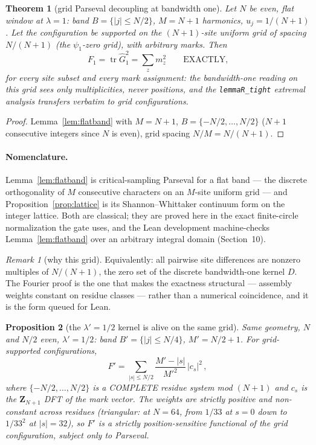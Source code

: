\documentclass[11pt]{article}
\theoremstyle{plain}
\newtheorem{theorem}{Theorem}[section]
\newtheorem{proposition}[theorem]{Proposition}
\theoremstyle{definition}
\theoremstyle{remark}
\newtheorem*{remk}{Remark}
\newcommand{\Z}{\mathbf{Z}}
\newcommand{\Gh}{\widehat{G}}
\newcommand{\tr}{\operatorname{tr}}
\begin{document}
\begin{theorem}[grid Parseval decoupling at bandwidth one]
\label{thm:parseval}
Let $N$ be even, flat window at $\lambda = 1$: band $B = \{|j| \le N/2\}$,
$M = N + 1$ harmonics, $u_j = 1/(N+1)$. Let the configuration be supported on the
$(N+1)$-site uniform grid of spacing $N/(N+1)$ (the $\psi_1$-zero grid), with
arbitrary marks. Then
\[
  F_1 = \tr \Gh_1^2 = \sum_z m_z^2 \qquad \text{EXACTLY,}
\]
for every site subset and every mark assignment: the bandwidth-one reading on
this grid sees only multiplicities, never positions, and the
\texttt{lemmaR\_tight} extremal analysis transfers verbatim to grid
configurations.
\end{theorem}

\begin{proof}
Lemma~\ref{lem:flatband} with $M = N + 1$, $B = \{-N/2, \ldots, N/2\}$ ($N + 1$
consecutive integers since $N$ is even), grid spacing $N/M = N/(N+1)$.
\end{proof}

\paragraph{Nomenclature.}
Lemma~\ref{lem:flatband} is critical-sampling Parseval for a flat band --- the
discrete orthogonality of $M$ consecutive characters on an $M$-site uniform grid ---
and Proposition~\ref{prop:lattice} is its Shannon--Whittaker continuum form on the
integer lattice. Both are classical; they are proved here in the exact finite-circle
normalization the gate uses, and the Lean development machine-checks
Lemma~\ref{lem:flatband} over an arbitrary integral domain (Section~10).

\begin{remk}[why this grid]
Equivalently: all pairwise site differences are nonzero multiples of $N/(N+1)$,
the zero set of the discrete bandwidth-one kernel $D$. The Fourier proof is the
one that makes the exactness structural --- assembly weights constant on residue
classes --- rather than a numerical coincidence, and it is the form queued for
Lean.
\end{remk}

\begin{proposition}[the $\lambda' = 1/2$ kernel is alive on the same grid]
\label{prop:halfband}
Same geometry, $N$ and $N/2$ even, $\lambda' = 1/2$: band
$B' = \{|j| \le N/4\}$, $M' = N/2 + 1$. For grid-supported configurations,
\[
  F' = \sum_{|s| \le N/2} \frac{M' - |s|}{M'^2}\, |c_s|^2 \,,
\]
where $\{-N/2, \ldots, N/2\}$ is a COMPLETE residue system mod $(N+1)$ and $c_s$
is the $\Z_{N+1}$ DFT of the mark vector. The weights are strictly positive and
non-constant across residues (triangular: at $N = 64$, from $1/33$ at $s = 0$
down to $1/33^2$ at $|s| = 32$), so $F'$ is a strictly position-sensitive
functional of the grid configuration, subject only to Parseval.
\end{proposition}
\end{document}
